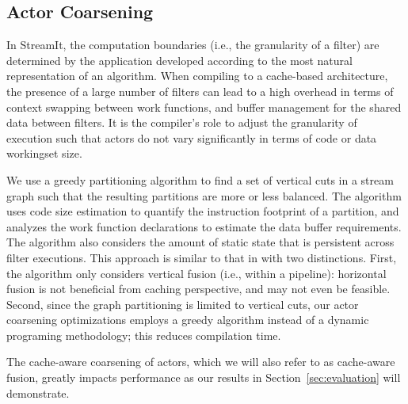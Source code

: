 \subsection{Actor Coarsening}

In StreamIt, the computation boundaries (i.e., the granularity of a
filter) are determined by the application developed according to the
most natural representation of an algorithm. When compiling to a
cache-based architecture, the presence of a  large number of filters
can lead to a high overhead in terms of context swapping between work
functions, and buffer management for the shared data between filters.
It is the compiler's role to adjust the granularity of execution such
that actors do not vary significantly in terms of code  or data
workingset size.

We use a greedy partitioning algorithm to find a set of vertical cuts
in a stream graph such that the resulting partitions are more or less
balanced. The algorithm uses code size estimation to quantify the
instruction footprint of a partition, and analyzes the work function
declarations to estimate the data buffer requirements. The algorithm
also considers the amount of static state that is persistent across
filter executions. This approach is similar to that in
\cite{streamit-asplos} with two distinctions. First, the algorithm
only considers vertical fusion (i.e., within a pipeline): horizontal
fusion is not beneficial from  caching perspective, and may not even
be feasible. Second, since the graph partitioning is limited to
vertical cuts, our actor coarsening optimizations employs a greedy
algorithm instead of a dynamic programing methodology; this reduces
compilation time. 

The cache-aware coarsening of actors, which we will also refer to as
cache-aware fusion, greatly impacts performance as
our results in Section~\ref{sec:evaluation} will demonstrate.